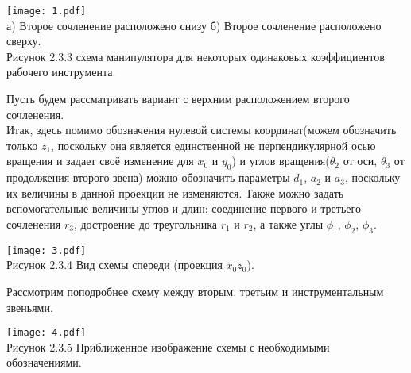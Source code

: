 \begin{enumerate}
\begin{center}
    \texttt{[image: 1.pdf]}\\
    а) Второе сочленение расположено снизу    б) Второе сочленение расположено сверху.\\
     Рисунок 2.3.3 схема манипулятора для некоторых одинаковых коэффициентов рабочего инструмента.\\
     
\end{center}

Пусть будем рассматривать вариант с верхним расположением второго сочленения.\\
Итак, здесь помимо обозначения нулевой системы координат(можем обозначить только $z_1$, поскольку она является единственной не перпендикулярной осью вращения и задает своё изменение для $x_0$ и $y_0$) и углов вращения($\theta_2$ от оси,  $\theta_3$ от продолжения второго звена) можно обозначить параметры $d_1$, $a_2$ и $a_3$, поскольку их величины в данной проекции не изменяются. Также можно задать вспомогательные величины углов и длин: соединение первого и третьего сочленения $r_3$, достроение до треугольника $r_1$ и $r_2$, а также углы $\phi_1$, $\phi_2$, $\phi_3$.\\

\begin{center}
    \texttt{[image: 3.pdf]}\\
     Рисунок 2.3.4 Вид схемы спереди (проекция $x_0z_0$).\\
\end{center}

Рассмотрим поподробнее схему между вторым, третьим и инструментальным звеньями.\\

\begin{center}
    \texttt{[image: 4.pdf]}\\
         Рисунок 2.3.5 Приближенное изображение схемы с необходимыми обозначениями. \\

\end{center}


\end{enumerate}
